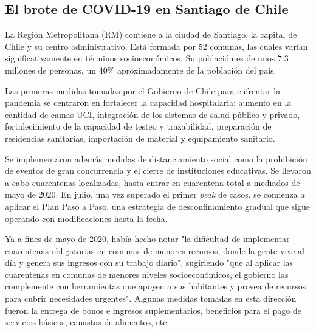 


\subsection{El brote de COVID-19 en Santiago de Chile }

La Región Metropolitana (RM) contiene a la ciudad de Santiago, la capital de Chile y su centro administrativo. Está formada por 52 comunas, las cuales varían significativamente en términos socioeconómicos. Su población es de unos \(7.3\) millones de personas, un 40\% aproximadamente de la población del país.

Las primeras medidas tomadas por el Gobierno de Chile para enfrentar la pandemia se centraron en fortalecer la capacidad hospitalaria: aumento en la cantidad de camas UCI, integración de los sistemas de salud público y privado, fortalecimiento de la capacidad de testeo y trazabilidad, preparación de residencias sanitarias, importación de material y equipamiento sanitario.

Se implementaron además medidas de distanciamiento social como la prohibición de eventos de gran concurrencia y el cierre de instituciones educativas. Se llevaron a cabo cuarentenas localizadas, hasta entrar en cuarentena total a mediados de mayo de 2020. En julio, una vez superado el primer \textit{peak} de casos, se comienza a aplicar el Plan Paso a Paso, una estrategia de desconfinamiento  gradual que sigue operando con modificaciones hasta la fecha.

Ya a fines de mayo de 2020, \cite{Olivares2020} había hecho notar "la dificultad de implementar cuarentenas obligatorias en comunas de menores recursos, donde la gente vive al día y genera sus ingresos con su trabajo diario", sugiriendo "que al aplicar las cuarentenas en comunas de menores niveles socioeconómicos, el gobierno las complemente con herramientas que apoyen a sus habitantes y provea de recursos para cubrir necesidades urgentes". Algunas medidas tomadas en esta dirección fueron la entrega de bonos e ingresos suplementarios, beneficios para el pago de servicios básicos, canastas de alimentos, etc.

